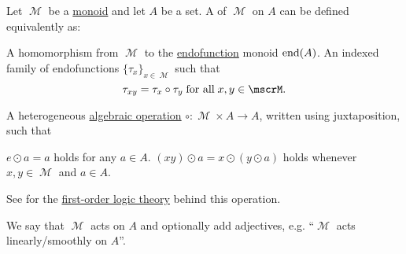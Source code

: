 \begin{definition}\label{def:left_monoid_action}
  Let \( \mscrM \) be a \hyperref[def:unital_magma/associative]{monoid} and let \( A \) be a set. A  of \( \mscrM \) on \( A \) can be defined equivalently as:
  \begin{thmenum}
     A homomorphism from \( \mscrM \) to the \hyperref[def:endofunction]{endofunction} monoid \( \operatorname{end}(A) \).
     An indexed family of endofunctions \( \{ \tau_x \}_{x \in \mscrM} \) such that
    \begin{equation}\label{eq:def:left_monoid_action/indirect_homomorphism}
      \tau_{xy} = \tau_x \circ \tau_y \T{for all} x, y \in \mscrM.
    \end{equation}

     A heterogeneous \hyperref[def:magma]{algebraic operation} \( \circ: \mscrM \times A \to A \), written using juxtaposition, such that
    \begin{thmenum}
       \( e \odot a = a \) holds for any \( a \in A \).
       \( (xy) \odot a = x \odot (y \odot a) \) holds whenever \( x, y \in \mscrM \) and \( a \in A \).
    \end{thmenum}

    See  for the \hyperref[def:first_order_semantics/theory]{first-order logic theory} behind this operation.
  \end{thmenum}

  We say that \( \mscrM \) acts on \( A \) and optionally add adjectives, e.g. \enquote{\( \mscrM \) acts linearly/smoothly on \( A \)}.
\end{definition}
